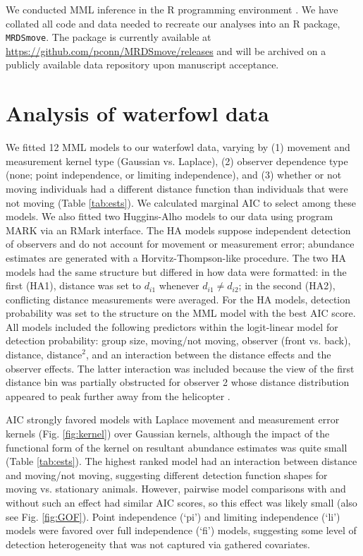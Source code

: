 \documentclass[aoas,preprint]{imsart}
\numberwithin{equation}{section}
\theoremstyle{plain}
\begin{document}
We conducted MML inference in the R programming environment \citep{RTeam2016}.  We have collated all code and data needed to recreate our analyses into an R package, \texttt{MRDSmove}. The package is currently available at \url{https://github.com/pconn/MRDSmove/releases} and will be archived on a publicly available data repository upon manuscript acceptance.

\section{Analysis of waterfowl data} \label{sec:data}

We fitted 12 MML models to our waterfowl data, varying by (1) movement and measurement kernel type (Gaussian vs. Laplace), (2) observer dependence type (none; point independence, or limiting independence), and (3) whether or not moving individuals had a different distance function than individuals that were not moving (Table \ref{tab:ests}).  We calculated marginal AIC to select among these models.  We also fitted two Huggins-Alho
\citep[HA;][]{Huggins1989,Alho1990} models to our data using program MARK \citep{WhiteBurnham1999} via an RMark \citep{Laake2013} interface. The HA models suppose independent detection of observers and do not account for movement or measurement error; abundance estimates are generated with a Horvitz-Thompson-like procedure. The two HA models had the same structure but differed in how data were formatted: in the first (HA1), distance was set to $d_{i1}$ whenever $d_{i1}\ne d_{i2}$; in the second (HA2), conflicting distance measurements were averaged.
For the HA models, detection probability was set to the structure on the MML model with the best AIC score.
All models included the following predictors within the logit-linear model for detection probability: group size, moving/not moving, observer (front vs. back), distance, $\text{distance}^2$, and an interaction between the distance effects and the observer effects.  The latter interaction was included because the view of the first distance bin was partially obstructed for observer 2 whose distance distribution appeared to peak further away from the helicopter \citep[see][]{AlisauskasConn2017}.

AIC strongly favored models with Laplace movement and measurement error kernels (Fig. \ref{fig:kernel}) over Gaussian kernels, although the impact of the functional form of the kernel on resultant abundance estimates was quite small (Table \ref{tab:ests}).  The highest ranked model had an interaction between distance and moving/not moving, suggesting different detection function shapes for moving vs. stationary animals. However, pairwise model comparisons with and without such an effect had similar AIC scores, so this effect was likely small (also see Fig. \ref{fig:GOF}). Point independence (`pi') and limiting independence (`li') models were favored over full independence (`fi') models, suggesting some level of detection heterogeneity that was not captured via gathered covariates.
\end{document}
